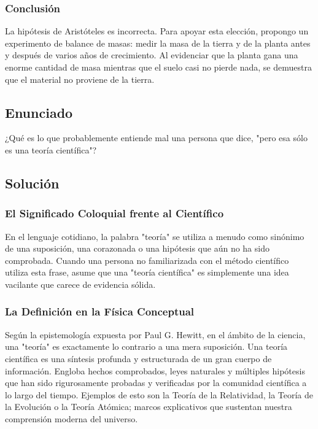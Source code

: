 \documentclass[12pt,letterpaper]{article}
\begin{document}
\subsubsection*{Conclusión}
La hipótesis de Aristóteles es incorrecta. Para apoyar esta elección, propongo un experimento de balance de masas: medir la masa de la tierra y de la planta antes y después de varios años de crecimiento. Al evidenciar que la planta gana una enorme cantidad de masa mientras que el suelo casi no pierde nada, se demuestra que el material no proviene de la tierra.

\newpage

\subsection*{Enunciado}
¿Qué es lo que probablemente entiende mal una persona que dice, "pero esa sólo es una teoría científica"?

\subsection*{Solución}

\subsubsection*{El Significado Coloquial frente al Científico}
En el lenguaje cotidiano, la palabra "teoría" se utiliza a menudo como sinónimo de una suposición, una corazonada o una hipótesis que aún no ha sido comprobada. Cuando una persona no familiarizada con el método científico utiliza esta frase, asume que una "teoría científica" es simplemente una idea vacilante que carece de evidencia sólida.

\subsubsection*{La Definición en la Física Conceptual}
Según la epistemología expuesta por Paul G. Hewitt, en el ámbito de la ciencia, una "teoría" es exactamente lo contrario a una mera suposición. Una teoría científica es una síntesis profunda y estructurada de un gran cuerpo de información. Engloba hechos comprobados, leyes naturales y múltiples hipótesis que han sido rigurosamente probadas y verificadas por la comunidad científica a lo largo del tiempo. Ejemplos de esto son la Teoría de la Relatividad, la Teoría de la Evolución o la Teoría Atómica; marcos explicativos que sustentan nuestra comprensión moderna del universo.
\end{document}
